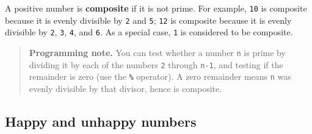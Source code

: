 \documentclass[12pt,a4paper,times]{article}
\begin{document}
A positive number is \textbf{composite} if it is not prime. For
example, \verb!10! is composite because it is evenly divisible
by \verb!2! and \verb!5!; \verb!12! is composite because it is evenly divisible
by \verb!2!, \verb!3!, \verb!4!, and \verb!6!. As a
special case, \verb!1! is considered to be composite.

\begin{quote}
\textbf{Programming note.} You can test whether a number \verb!n! is
prime by dividing it by each of the numbers \texttt{2} through
\texttt{n-1}, and testing if the remainder is zero (use the
\textbf{\texttt{\%}} operator). A zero remainder means \verb!n! was
evenly divisible by that divisor, hence is composite.
\end{quote}

\subsection{Happy and unhappy numbers}\label{happy-and-unhappy-numbers}
\end{document}
